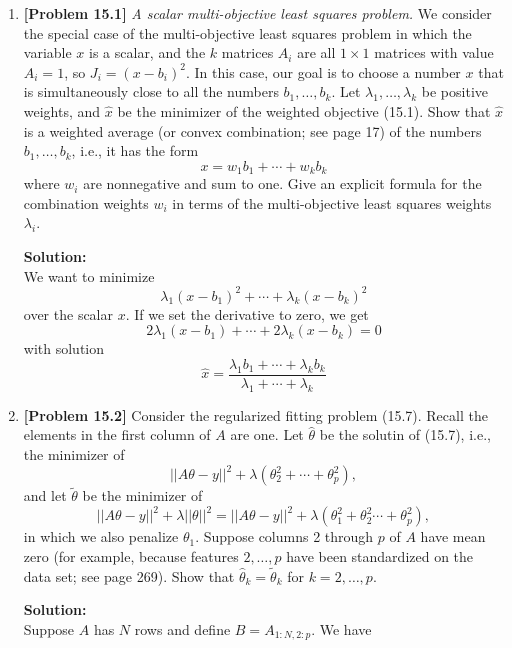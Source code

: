 \begin{enumerate}[label=(\alph*)]
	\item \textbf{[Problem 15.1]} \textit{A scalar multi-objective least squares
		      problem.} We consider the special case of the multi-objective least
	      squares problem in which the variable $x$ is a scalar, and the $k$
	      matrices $A_i$ are all $1 \times 1$ matrices with value $A_i = 1$, so
	      $J_i = (x - b_i)^2$. In this case, our goal is to choose a number $x$
	      that is simultaneously close to all the numbers $b_1, \dots, b_k$. Let
	      $\lambda_1, \dots, \lambda_k$ be positive weights, and $\hat{x}$ be the
	      minimizer of the weighted objective (15.1). Show that $\hat{x}$ is a
	      weighted average (or convex combination; see page 17) of the numbers
	      $b_1, \dots, b_k$, i.e., it has the form
	      $$ x = w_1b_1 + \cdots + w_kb_k $$
	      where $w_i$ are nonnegative and sum to one. Give an explicit formula for
	      the combination weights $w_i$ in terms of the multi-objective least
	      squares weights $\lambda_i$.
	      \begin{tcolorbox}
		      \textbf{Solution:} \\
		      We want to minimize
		      $$ \lambda_1(x - b_1)^2 + \cdots + \lambda_k(x - b_k)^2 $$
		      over the scalar $x$. If we set the derivative to zero, we get
		      $$ 2\lambda_1(x - b_1) + \cdots + 2\lambda_k(x - b_k) = 0 $$
		      with solution
		      $$ \hat{x} = \frac{\lambda_1b_1 + \cdots + \lambda_kb_k}{\lambda_1 + \cdots + \lambda_k} $$
	      \end{tcolorbox}
	\item \textbf{[Problem 15.2]} Consider the regularized fitting problem
	      (15.7). Recall the elements in the first column of $A$ are one. Let
	      $\hat{\theta}$ be the solutin of (15.7), i.e., the minimizer of
	      $$ || A\theta - y ||^2 + \lambda(\theta_2^2 + \cdots + \theta_p^2),$$
	      and let $\tilde{\theta}$ be the minimizer of
	      $$ || A\theta - y ||^2 + \lambda||\theta||^2 = || A\theta - y ||^2 +
		      \lambda(\theta_1^2 + \theta_2^2 \cdots + \theta_p^2),$$
	      in which we also penalize $\theta_1$. Suppose columns 2 through $p$ of
	      $A$ have mean zero (for example, because features $2, \ldots, p$ have
	      been standardized on the data set; see page 269). Show that
	      $\hat{\theta}_k = \tilde{\theta}_k$ for $k = 2, \ldots, p$.
	      \begin{tcolorbox}
		      \textbf{Solution:} \\
		      Suppose $A$ has $N$ rows and define $B = A_{1:N, 2:p}$. We have

\end{tcolorbox}
\end{enumerate}
